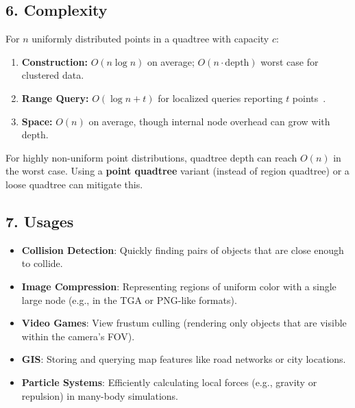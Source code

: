 \subsection{6. Complexity}
\begin{theorem}
\label{thm:qt_complexity}
For $n$ uniformly distributed points in a quadtree with capacity $c$:
\begin{enumerate}
    \item \textbf{Construction:} $O(n \log n)$ on average; $O(n \cdot \text{depth})$ worst case for clustered data.
    \item \textbf{Range Query:} $O(\log n + t)$ for localized queries reporting $t$ points~\cite{samet1984}.
    \item \textbf{Space:} $O(n)$ on average, though internal node overhead can grow with depth.
\end{enumerate}
\end{theorem}

\begin{remark}
For highly non-uniform point distributions, quadtree depth can reach $O(n)$ in the worst case. Using a \textbf{point quadtree} variant (instead of region quadtree) or a loose quadtree can mitigate this.
\end{remark}

\subsection{7. Usages}
\begin{itemize}
    \item \textbf{Collision Detection}: Quickly finding pairs of objects that are close enough to collide.
    \item \textbf{Image Compression}: Representing regions of uniform color with a single large node (e.g., in the TGA or PNG-like formats).
    \item \textbf{Video Games}: View frustum culling (rendering only objects that are visible within the camera's FOV).
    \item \textbf{GIS}: Storing and querying map features like road networks or city locations.
    \item \textbf{Particle Systems}: Efficiently calculating local forces (e.g., gravity or repulsion) in many-body simulations.
\end{itemize}

